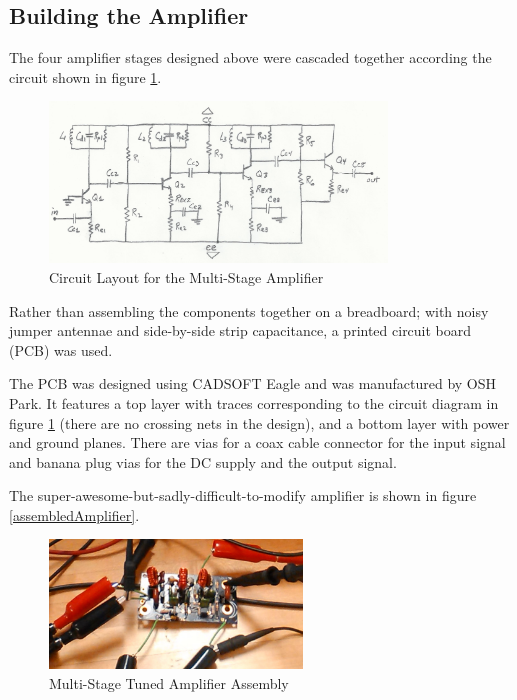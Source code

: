 \documentclass[titlepage, letterpaper, 11pt]{article}
\begin{document}
\subsection{Building the Amplifier}

The four amplifier stages designed above were cascaded together
according the circuit shown in figure \ref{multiStageTunedAmplifier}.

\begin{figure}[ht]
	\centering
	\includegraphics[width=0.8\textwidth]
		{figures/multiStageTunedAmplifier}
	\caption{Circuit Layout for the Multi-Stage Amplifier}
	\label{multiStageTunedAmplifier}
\end{figure}

Rather than assembling the components together on a breadboard; with
noisy jumper antennae and side-by-side strip capacitance, a printed
circuit board (PCB) was used. 

The PCB was designed using CADSOFT Eagle and was manufactured by OSH
Park. It features a top layer with traces corresponding to the circuit
diagram in figure \ref{multiStageTunedAmplifier} (there are no crossing
nets in the design), and a bottom layer with power and ground planes.
There are vias for a coax cable connector for the input signal and
banana plug vias for the DC supply and the output signal.

The super-awesome-but-sadly-difficult-to-modify amplifier is shown
in figure \ref{assembledAmplifier}.

\begin{figure}[ht]
	\centering
	\includegraphics[width=0.6\textwidth]
		{images/assembledAmplifier}
	\caption{Multi-Stage Tuned Amplifier Assembly}
	\label{assembedAmplifier}
\end{figure}
\end{document}
